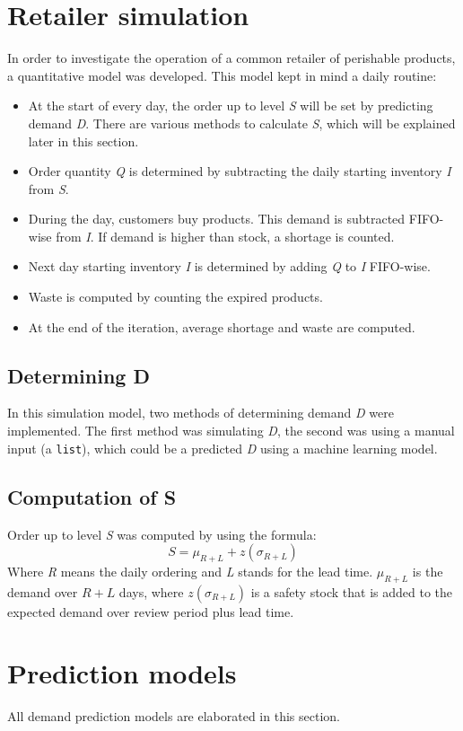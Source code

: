 \documentclass[final,authoryear,5p,times,twocolumn, 12pt]{elsarticle}
\begin{document}
\section{Retailer simulation}
In order to investigate the operation of a common retailer of perishable products, a quantitative model was developed. This model kept in mind a daily routine:
\begin{itemize}[]
	\item At the start of every day, the order up to level \textit{S} will be set by predicting demand \textit{D}. There are various methods to calculate \textit{S}, which will be explained later in this section.
	\item Order quantity \textit{Q} is determined by subtracting the daily starting inventory \textit{I} from \textit{S}.
	\item During the day, customers buy products. This demand is subtracted FIFO-wise from \textit{I}. If demand is higher than stock, a shortage is counted.
	\item Next day starting inventory \textit{I} is determined by adding \textit{Q} to \textit{I} FIFO-wise.
	\item Waste is computed by counting the expired products.
	\item At the end of the iteration, average shortage and waste are computed.
\end{itemize}
\subsection{Determining D}
In this simulation model, two methods of determining demand \textit{D} were implemented. The first method was simulating \textit{D}, the second was using a manual input (a \texttt{list}), which could be a predicted \textit{D} using a machine learning model.

\subsection{Computation of S}
Order up to level \textit{S} was computed by using the formula: 
\begin{equation}
S = \mu_{R+L} + z(\sigma_{R+L})
\end{equation}
Where \textit{R} means the daily ordering and \textit{L} stands for the lead time. $\mu_{R+L}$ is the demand over $R+L$ days, where $z(\sigma_{R+L})$ is a safety stock that is added to the expected demand over review period plus lead time. 
\section{Prediction models}
\label{sec:models}
All demand prediction models are elaborated in this section.
\end{document}
